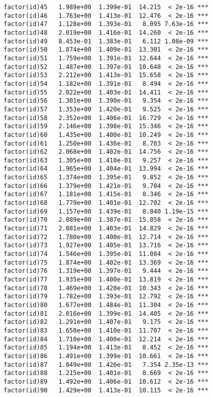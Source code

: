 \documentclass[]{article}
\begin{document}
\begin{verbatim}
factor(id)45   1.989e+00  1.399e-01  14.215  < 2e-16 ***
factor(id)46   1.763e+00  1.413e-01  12.476  < 2e-16 ***
factor(id)47   1.128e+00  1.393e-01   8.095 7.63e-16 ***
factor(id)48   2.019e+00  1.416e-01  14.260  < 2e-16 ***
factor(id)49   8.453e-01  1.383e-01   6.112 1.08e-09 ***
factor(id)50   1.874e+00  1.409e-01  13.301  < 2e-16 ***
factor(id)51   1.759e+00  1.391e-01  12.644  < 2e-16 ***
factor(id)52   1.487e+00  1.397e-01  10.648  < 2e-16 ***
factor(id)53   2.212e+00  1.413e-01  15.658  < 2e-16 ***
factor(id)54   1.182e+00  1.391e-01   8.494  < 2e-16 ***
factor(id)55   2.022e+00  1.403e-01  14.411  < 2e-16 ***
factor(id)56   1.301e+00  1.390e-01   9.354  < 2e-16 ***
factor(id)57   1.353e+00  1.420e-01   9.525  < 2e-16 ***
factor(id)58   2.352e+00  1.406e-01  16.729  < 2e-16 ***
factor(id)59   2.146e+00  1.398e-01  15.346  < 2e-16 ***
factor(id)60   1.435e+00  1.400e-01  10.249  < 2e-16 ***
factor(id)61   1.250e+00  1.436e-01   8.703  < 2e-16 ***
factor(id)62   2.068e+00  1.402e-01  14.756  < 2e-16 ***
factor(id)63   1.305e+00  1.410e-01   9.257  < 2e-16 ***
factor(id)64   1.965e+00  1.404e-01  13.994  < 2e-16 ***
factor(id)65   1.374e+00  1.395e-01   9.852  < 2e-16 ***
factor(id)66   1.379e+00  1.421e-01   9.704  < 2e-16 ***
factor(id)67   1.181e+00  1.415e-01   8.346  < 2e-16 ***
factor(id)68   1.779e+00  1.401e-01  12.702  < 2e-16 ***
factor(id)69   1.157e+00  1.439e-01   8.040 1.19e-15 ***
factor(id)70   2.089e+00  1.387e-01  15.058  < 2e-16 ***
factor(id)71   2.081e+00  1.403e-01  14.829  < 2e-16 ***
factor(id)72   1.780e+00  1.400e-01  12.714  < 2e-16 ***
factor(id)73   1.927e+00  1.405e-01  13.716  < 2e-16 ***
factor(id)74   1.546e+00  1.395e-01  11.084  < 2e-16 ***
factor(id)75   1.874e+00  1.402e-01  13.369  < 2e-16 ***
factor(id)76   1.319e+00  1.397e-01   9.444  < 2e-16 ***
factor(id)77   1.935e+00  1.400e-01  13.819  < 2e-16 ***
factor(id)78   1.469e+00  1.420e-01  10.343  < 2e-16 ***
factor(id)79   1.782e+00  1.393e-01  12.792  < 2e-16 ***
factor(id)80   1.677e+00  1.484e-01  11.304  < 2e-16 ***
factor(id)81   2.016e+00  1.399e-01  14.405  < 2e-16 ***
factor(id)82   1.291e+00  1.407e-01   9.175  < 2e-16 ***
factor(id)83   1.650e+00  1.410e-01  11.707  < 2e-16 ***
factor(id)84   1.710e+00  1.400e-01  12.214  < 2e-16 ***
factor(id)85   1.194e+00  1.413e-01   8.452  < 2e-16 ***
factor(id)86   1.491e+00  1.399e-01  10.661  < 2e-16 ***
factor(id)87   1.049e+00  1.426e-01   7.354 2.35e-13 ***
factor(id)88   1.215e+00  1.401e-01   8.669  < 2e-16 ***
factor(id)89   1.492e+00  1.406e-01  10.612  < 2e-16 ***
factor(id)90   1.429e+00  1.413e-01  10.115  < 2e-16 ***

\end{verbatim}
\end{document}
